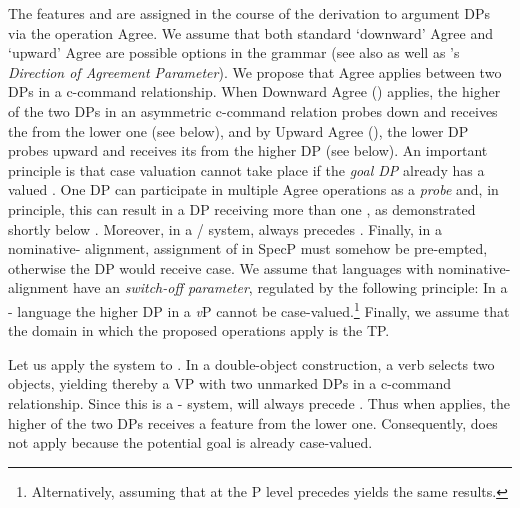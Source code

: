 \documentclass[output=paper,modfonts,newtxmath,hidelinks]{langscibook}
\begin{document}
\noindent The features \hr{} and \lr{} are assigned in the course of the derivation to argument DPs via the operation Agree. We assume that both standard `downward' Agree and `upward' Agree \citep[see][]{chomsky86,chomsky91,kayne89,pollock89,koopman06} are possible options in the grammar (see also \citealt[92f.]{abels-phases} as well as \citeauthor{baker-agrbook}'s \citeyear[155]{baker-agrbook} \textit{Direction of Agreement Parameter}). We propose that Agree applies between two DPs in a c-command relationship. When Downward Agree (\down) applies, the higher of the two DPs in an asymmetric c-command relation probes down and receives the \lr{} from the lower one (see  below), and by Upward Agree (\up), the lower DP probes upward and receives its \hr{}  from the higher DP (see  below). An important principle is that case valuation cannot take place if the \textit{goal DP} already has a valued  \citep{bittnerhale96,baker15}. One DP can participate in multiple Agree operations as a \textit{probe} and, in principle, this can result in a DP receiving more than one , as demonstrated shortly below . Moreover, in a \nomm/\accc{} system, \down{} always precedes \up. Finally, in a nominative- alignment, assignment of \lr{} in Spec\littlev{}P must somehow be pre-empted, otherwise the DP would receive  case. We assume that languages with nominative-{\linebreak} alignment have an \textit{ switch-off parameter}, regulated by the following principle: In a \nomm-\accc{} language the higher DP in a \textit{v}P cannot be case-valued.\footnote{Alternatively, assuming that at the \littlev{}P level \up{} precedes \down{} yields the same results.} Finally, we assume that the domain in which the proposed operations apply is the TP. 

\largerpage[2]
Let us apply the system to  . In a double-object construction, a verb selects two objects, yielding thereby a VP with two unmarked DPs in a c-command relationship. Since this is a \nomm{}-\accc{} system, \down{} will always precede \up{}. Thus when \down{} applies, the higher of the two DPs receives a \lr{} feature from the lower one. Consequently, \up{} does not apply because the potential goal is already case-valued.  
\end{document}
